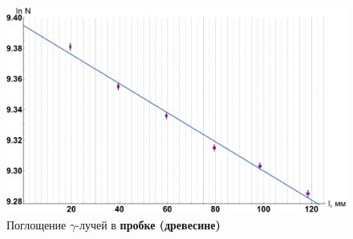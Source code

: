\documentclass[12pt]{kiarticle}
\newcommand{\ga}{\ensuremath{\gamma}}
\begin{document}
	\begin{figure}[h!]
	\label{graf_d}
	\includegraphics[scale=0.47]{d.pdf}
	\caption{Поглощение \ga-лучей в \textbf{пробке (древесине)}}
\end{figure}


	
	
\end{document}
